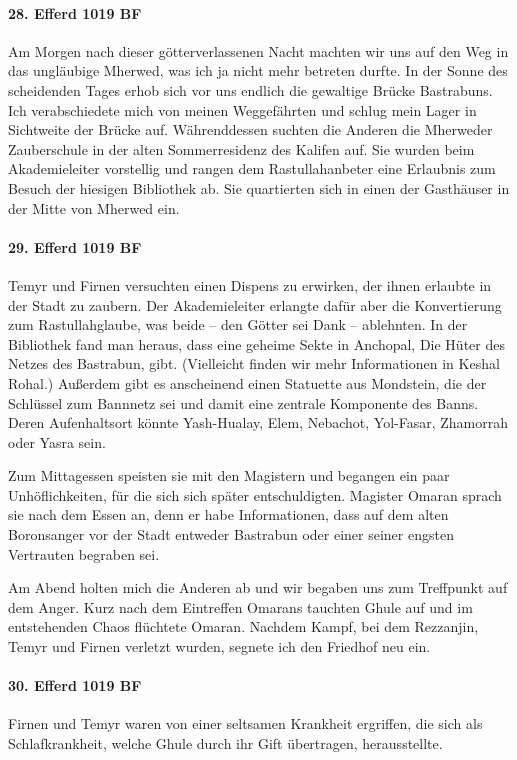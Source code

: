 \paragraph{28. Efferd 1019 BF}
Am Morgen nach dieser götterverlassenen Nacht machten wir uns auf den Weg in das ungläubige Mherwed, was ich ja nicht mehr betreten durfte.
In der Sonne des scheidenden Tages erhob sich vor uns endlich die gewaltige Brücke Bastrabuns. Ich verabschiedete mich von meinen Weggefährten und schlug mein Lager in Sichtweite der Brücke auf. Währenddessen suchten die Anderen die Mherweder Zauberschule in der alten Sommerresidenz des Kalifen auf. Sie wurden beim Akademieleiter vorstellig und rangen dem Rastullahanbeter eine Erlaubnis zum Besuch der hiesigen Bibliothek ab. Sie quartierten sich in einen der Gasthäuser in der Mitte von Mherwed ein.

\paragraph{29. Efferd 1019 BF}
Temyr und Firnen versuchten einen Dispens zu erwirken, der ihnen erlaubte in der Stadt zu zaubern. Der Akademieleiter erlangte dafür aber die Konvertierung zum Rastullahglaube, was beide -- den Götter sei Dank -- ablehnten. In der Bibliothek fand man heraus, dass eine geheime Sekte in Anchopal, Die Hüter des Netzes des Bastrabun, gibt. (Vielleicht finden wir mehr Informationen in Keshal Rohal.) Außerdem gibt es anscheinend einen Statuette aus Mondstein, die der Schlüssel zum Bannnetz sei und damit eine zentrale Komponente des Banns. Deren Aufenhaltsort könnte Yash-Hualay, Elem, Nebachot, Yol-Fasar, Zhamorrah oder Yasra sein.

Zum Mittagessen speisten sie mit den Magistern und begangen ein paar Unhöflichkeiten, für die sich sich später entschuldigten.
Magister Omaran sprach sie nach dem Essen an, denn er habe Informationen, dass auf dem alten Boronsanger vor der Stadt entweder Bastrabun oder einer seiner engsten Vertrauten begraben sei.

Am Abend holten mich die Anderen ab und wir begaben uns zum Treffpunkt auf dem Anger. Kurz nach dem Eintreffen Omarans tauchten Ghule auf und im entstehenden Chaos flüchtete Omaran. Nachdem Kampf, bei dem Rezzanjin, Temyr und Firnen verletzt wurden, segnete ich den Friedhof neu ein.

\paragraph{30. Efferd 1019 BF}
Firnen und Temyr waren von einer seltsamen Krankheit ergriffen, die sich als Schlafkrankheit, welche Ghule durch ihr Gift übertragen, herausstellte.

